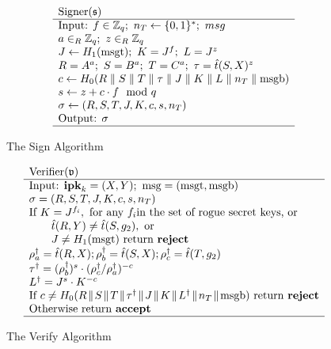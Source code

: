 \begin{figure}[H]
$$\begin{array}{l}
\text{Signer}(\mathfrak{s}) \\
\hline
\text{Input: } f \in {\mathbb Z}_q; \ n_T \leftarrow \{0,1\}^\ast; \ msg \\
a \in_R {\mathbb Z}_q; \ z \in_R {\mathbb Z}_q \\
J \leftarrow H_1(\text{msgt}); \ K = J^f; \ L = J^z \\
R = A^a; \ S = B^a; \ T = C^a; \ \tau = \hat{t}(S,X)^z \\
c \leftarrow H_0(R \parallel S \parallel T \parallel \tau \parallel J \parallel K \parallel L \parallel n_T \parallel \text{msgb}) \\
s \leftarrow z + c \cdot f \mod q \\
\sigma \leftarrow (R,S,T,J,K,c,s,n_T) \\
\text{Output: } \sigma \\
\hline
\end{array}
$$
\caption{The Sign Algorithm}
\label{fig:sign}
\end{figure}

\begin{figure}[H]
$$\begin{array}{l}
\text{Verifier}(\mathfrak{v}) \\
\hline
\text{Input: \textbf{ipk}}_k = (X,Y); \ \text{msg} = (\text{msgt}, \text{msgb}) \\
\sigma = (R,S,T,J,K,c,s,n_T) \\
\text{If } K = J^{f_i}, \text{ for any } f_i \text{in the set of rogue secret keys, or} \\
\qquad \hat{t}(R,Y) \neq \hat{t}(S,g_2), \text{ or} \\
\qquad J \neq H_1(\text{msgt}) \text{ return \textbf{reject}} \\
\rho_a^\dagger = \hat{t}(R,X); \rho_b^\dagger = \hat{t}(S,X); \rho_c^\dagger = \hat{t}(T,g_2) \\
\tau^\dagger = (\rho_b^\dagger)^s \cdot (\rho_c^\dagger / \rho_a^\dagger)^{-c} \\
L^\dagger = J^s \cdot K^{-c} \\
\text{If } c \neq H_0 (R \con S \con T \con \tau^\dagger \con J \con K \con L^\dagger \con n_T \con \text{msgb}) \text{ return \textbf{reject}} \\
\text{Otherwise return \textbf{accept}} \\
\hline
\end{array}
$$
\caption{The Verify Algorithm}
\label{fig:verify}
\end{figure}

